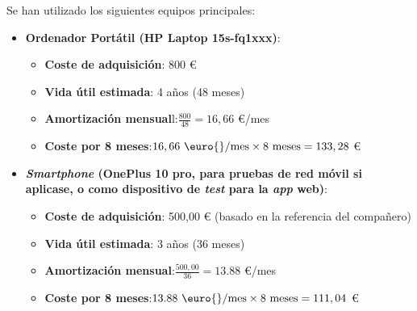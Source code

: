 Se han utilizado los siguientes equipos principales:

\begin{itemize}

    \item\textbf{Ordenador Portátil (HP Laptop 15s-fq1xxx)}:
        \begin{itemize}

            \item\textbf{Coste de adquisición}: 800 \euro{} 
            
            \item\textbf{Vida útil estimada}: 4 años (48 meses)
            
            \item\textbf{Amortización mensual}l:$\displaystyle \frac{800}{48} = 16,66 $ \euro{}/mes
            
            \item\textbf{Coste por 8 meses}:$\displaystyle 16,66 \text{ \euro{}/mes} \times 8 \text{ meses} = 133,28 $ \euro{}
                   
        \end{itemize}
    
    \item\textbf{\textit{Smartphone} (OnePlus 10 pro, para pruebas de red móvil si aplicase, o como dispositivo de \textit{test} para la \textit{app} web)}:
    
        \begin{itemize}
        
            \item\textbf{Coste de adquisición}: 500,00 \euro{} (basado en la referencia del compañero)
            
            \item\textbf{Vida útil estimada}: 3 años (36 meses)
            
            \item\textbf{Amortización mensual}:$\displaystyle \frac{500,00}{36} = 13.88 $ \euro{}/mes
            
            \item\textbf{Coste por 8 meses}:$\displaystyle 13.88 \text{ \euro{}/mes} \times 8 \text{ meses} = 111,04 $ \euro{}
                
        \end{itemize}
    

\end{itemize}
